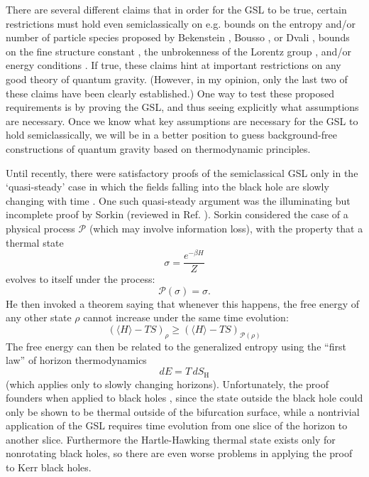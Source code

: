 \documentclass{article}
\begin{document}
There are several different claims that in order for the GSL to be true, certain restrictions must hold even semiclassically on e.g. bounds on the entropy and/or number of particle species proposed by Bekenstein \cite{bek81b}, Bousso \cite{bousso02b}, or Dvali \cite{DS08}, bounds on the fine structure constant \cite{davies08}, the unbrokenness of the Lorentz group \cite{EFJW07}, and/or energy conditions \cite{anec}.  If true, these claims hint at important restrictions on any good theory of quantum gravity.  (However, in my opinion, only the last two of these claims have been clearly established.)  One way to test these proposed requirements is by proving the GSL, and thus seeing explicitly what assumptions are necessary.  Once we know what key assumptions are necessary for the GSL to hold semiclassically, we will be in a better position to guess background-free constructions of quantum gravity based on thermodynamic principles.

Until recently, there were satisfactory proofs of the semiclassical GSL only in the `quasi-steady' case in which the fields falling into the black hole are slowly changing with time \cite{10proofs}.  One such quasi-steady argument was the illuminating but incomplete proof by Sorkin \cite{sorkin98} (reviewed in Ref. \cite{10proofs}).  Sorkin considered the case of a physical process $\mathcal{P}$ (which may involve information loss), with the property that a thermal state
\begin{equation}
\sigma = \frac{e^{-\beta H}}{Z}
\end{equation}
evolves to itself under the process:
\begin{equation}
\mathcal{P}(\sigma) = \sigma.
\end{equation}
He then invoked a theorem saying that whenever this happens, the free energy of any other state $\rho$ cannot increase under the same time evolution:
\begin{equation}
(\langle H \rangle - TS)_\rho \ge (\langle H \rangle - TS)_{\mathcal{P}(\rho)}
\end{equation}
The free energy can then be related to the generalized entropy using the ``first law'' of horizon thermodynamics
\begin{equation}
dE = T\,dS_{\mathrm{H}}
\end{equation}
(which applies only to slowly changing horizons).  Unfortunately, the proof founders when applied to black holes \cite{10proofs}, since the state outside the black hole could only be shown to be thermal outside of the bifurcation surface, while a nontrivial application of the GSL requires time evolution from one slice of the horizon to another slice.  Furthermore the Hartle-Hawking thermal state exists only for nonrotating black holes, so there are even worse problems in applying the proof to Kerr black holes.
\end{document}
